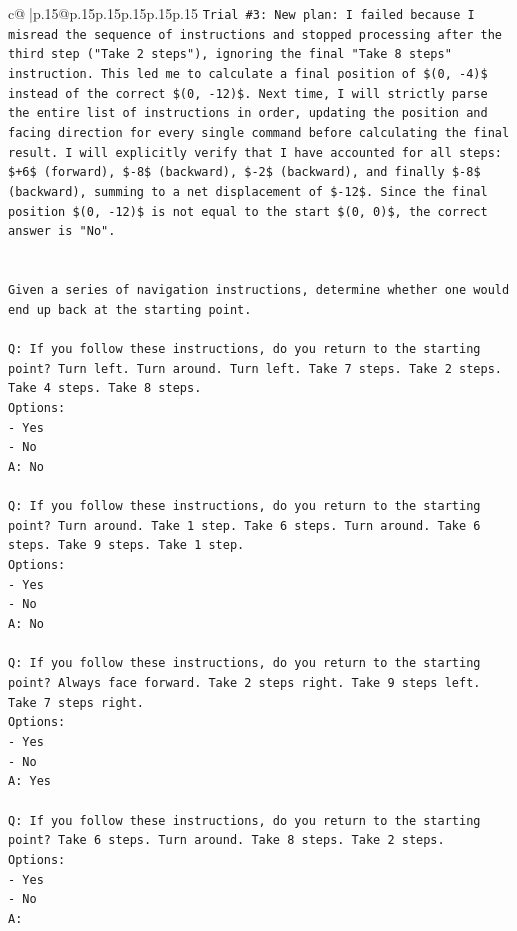 \documentclass{article}
\begin{document}
{\begin{supertabular}{c@{$\;$}|p{.15\linewidth}@{}p{.15\linewidth}p{.15\linewidth}p{.15\linewidth}p{.15\linewidth}p{.15\linewidth}}
{{{\texttt{Trial \#3: New plan: I failed because I misread the sequence of instructions and stopped processing after the third step ("Take 2 steps"), ignoring the final "Take 8 steps" instruction. This led me to calculate a final position of \$(0, {-}4)\$ instead of the correct \$(0, {-}12)\$. Next time, I will strictly parse the entire list of instructions in order, updating the position and facing direction for every single command before calculating the final result. I will explicitly verify that I have accounted for all steps: \$+6\$ (forward), \${-}8\$ (backward), \${-}2\$ (backward), and finally \${-}8\$ (backward), summing to a net displacement of \${-}12\$. Since the final position \$(0, {-}12)\$ is not equal to the start \$(0, 0)\$, the correct answer is "No".} \\
\\ 
\\ 
\texttt{Given a series of navigation instructions, determine whether one would end up back at the starting point.} \\
\\ 
\texttt{Q: If you follow these instructions, do you return to the starting point? Turn left. Turn around. Turn left. Take 7 steps. Take 2 steps. Take 4 steps. Take 8 steps.} \\
\texttt{Options:} \\
\texttt{{-} Yes} \\
\texttt{{-} No} \\
\texttt{A: No} \\
\\ 
\texttt{Q: If you follow these instructions, do you return to the starting point? Turn around. Take 1 step. Take 6 steps. Turn around. Take 6 steps. Take 9 steps. Take 1 step.} \\
\texttt{Options:} \\
\texttt{{-} Yes} \\
\texttt{{-} No} \\
\texttt{A: No} \\
\\ 
\texttt{Q: If you follow these instructions, do you return to the starting point? Always face forward. Take 2 steps right. Take 9 steps left. Take 7 steps right.} \\
\texttt{Options:} \\
\texttt{{-} Yes} \\
\texttt{{-} No} \\
\texttt{A: Yes} \\
\\ 
\texttt{Q: If you follow these instructions, do you return to the starting point? Take 6 steps. Turn around. Take 8 steps. Take 2 steps.} \\
\texttt{Options:} \\
\texttt{{-} Yes} \\
\texttt{{-} No} \\
\texttt{A:} \\
            }
        }
    }
     \\ \\


\end{supertabular}}
\end{document}

